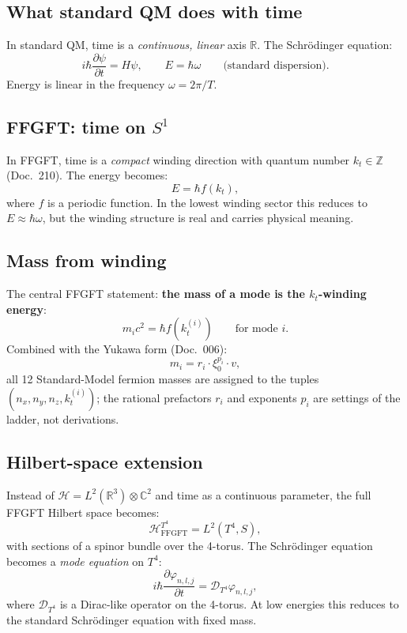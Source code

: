 \subsection{What standard QM does with time}

In standard QM, time is a \emph{continuous, linear} axis $\mathbb{R}$.
The Schrödinger equation:
\begin{equation}
  i\hbar \frac{\partial \psi}{\partial t} = H \psi,
  \qquad
  E = \hbar \omega
  \qquad \text{(standard dispersion)}.
\end{equation}
Energy is linear in the frequency $\omega = 2\pi/T$.

\subsection{FFGFT: time on $S^1$}

In FFGFT, time is a \emph{compact} winding direction with quantum
number $k_t \in \mathbb{Z}$ (Doc.~210). The energy becomes:
\begin{equation}
  \boxed{
    E = \hbar f(k_t),
  }
\end{equation}
where $f$ is a periodic function. In the lowest winding sector this
reduces to $E \approx \hbar \omega$, but the winding structure is
real and carries physical meaning.

\subsection{Mass from winding}

The central FFGFT statement: \textbf{the mass of a mode is the
$k_t$-winding energy}:
\begin{equation}
  m_i c^2 = \hbar f(k_t^{(i)})
  \qquad \text{for mode $i$}.
\end{equation}
Combined with the Yukawa form (Doc.~006):
\begin{equation}
  m_i = r_i \cdot \xi_0^{p_i} \cdot v,
\end{equation}
all 12 Standard-Model fermion masses are assigned to the tuples
$(n_x, n_y, n_z, k_t^{(i)})$; the rational prefactors $r_i$ and
exponents $p_i$ are settings of the ladder, not derivations.

\subsection{Hilbert-space extension}

Instead of $\mathcal{H} = L^2(\mathbb{R}^3) \otimes \mathbb{C}^2$ and
time as a continuous parameter, the full FFGFT Hilbert space becomes:
\begin{equation}
  \mathcal{H}^{T^4}_{\text{FFGFT}} = L^2(T^4, S),
\end{equation}
with sections of a spinor bundle over the 4-torus. The Schrödinger
equation becomes a \emph{mode equation} on $T^4$:
\begin{equation}
  i\hbar \frac{\partial \varphi_{n,l,j}}{\partial t}
  = \mathcal{D}_{T^4} \varphi_{n,l,j},
\end{equation}
where $\mathcal{D}_{T^4}$ is a Dirac-like operator on the 4-torus.
At low energies this reduces to the standard Schrödinger equation
with fixed mass.

